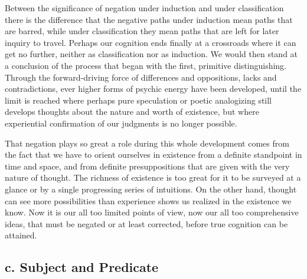 \documentclass[12pt,a4paper]{book}
\newcommand{\opage}[1]{\marginnote{\footnotesize\textit{[#1]}}}
\begin{document}
Between the significance of negation under induction and under
classification there is the difference that the negative paths under
induction mean paths that are barred, while under classification they mean
paths that are left for later inquiry to travel. Perhaps our cognition
ends finally at a crossroads where it can get no further, neither as
classification nor as induction. We would then \opage{82}stand at a conclusion of
the process that began with the first, primitive distinguishing. Through
the forward-driving force of differences and oppositions, lacks and
contradictions, ever higher forms of psychic energy have been developed,
until the limit is reached where perhaps pure speculation or poetic
analogizing still develops thoughts about the nature and worth of
existence, but where experiential confirmation of our judgments is no
longer possible.

That negation plays so great a role during this whole development comes
from the fact that we have to orient ourselves in existence from a
definite standpoint in time and space, and from definite presuppositions
that are given with the very nature of thought. The richness of existence
is too great for it to be surveyed at a glance or by a single progressing
series of intuitions. On the other hand, thought can see more
possibilities than experience shows us realized in the existence we know.
Now it is our all too limited points of view, now our all too
comprehensive ideas, that must be negated or at least corrected, before
true cognition can be attained.

\subsection*{c. Subject and Predicate}
\label{ssec:subjekt-praedikat}
\end{document}
